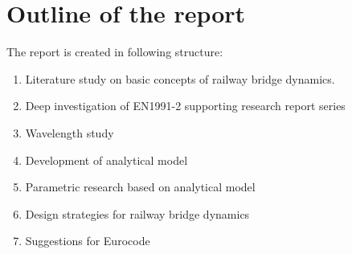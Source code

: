 \section{Outline of the report}
The report is created in following structure:

\begin{enumerate}
   \item Literature study on basic concepts of railway bridge dynamics.
   \item Deep investigation of EN1991-2 supporting research report series
   \item Wavelength study
   \item Development of analytical model
   \item Parametric research based on analytical model
   \item Design strategies for railway bridge dynamics
   \item Suggestions for Eurocode
\end{enumerate}
